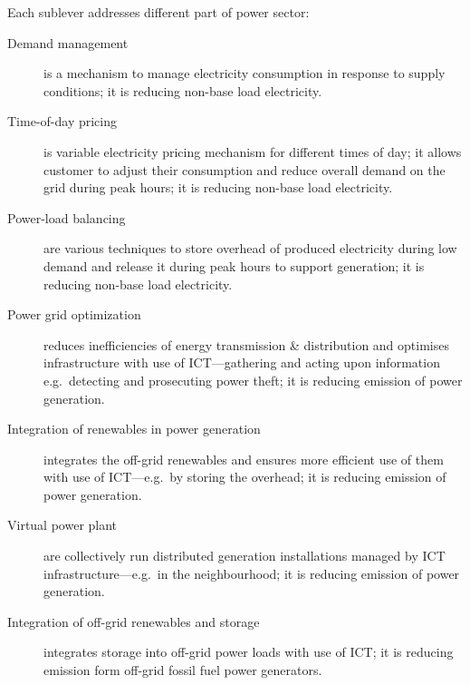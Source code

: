 \documentclass[11pt, twocolumn]{article}
\begin{document}
Each sublever addresses different part of power sector:
\begin{description}
\item[Demand management] is a mechanism to manage electricity consumption in response to supply conditions; it is reducing non-base load electricity.

\item[Time-of-day pricing] is variable electricity pricing mechanism for different times of day; it allows customer to adjust their consumption and reduce overall demand on the grid during peak hours; it is reducing non-base load electricity.

\item[Power-load balancing] are various techniques to store overhead of produced electricity during low demand and release it during peak hours to support generation; it is reducing non-base load electricity.

\item[Power grid optimization] reduces inefficiencies of energy transmission \& distribution and optimises infrastructure with use of ICT---gathering and acting upon information e.g.\ detecting and prosecuting power theft; it is reducing emission of power generation.

\item[Integration of renewables in power generation] integrates the off-grid renewables and ensures more efficient use of them with use of ICT---e.g.\ by storing the overhead; it is reducing emission of power generation.

\item[Virtual power plant] are collectively run distributed generation installations managed by ICT infrastructure---e.g.\ in the neighbourhood; it is reducing emission of power generation.

\item[Integration of off-grid renewables and storage] integrates storage into off-grid power loads with use of ICT; it is reducing emission form off-grid fossil fuel power generators.
\end{description}
\end{document}
